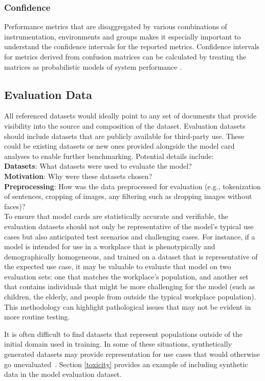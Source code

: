 \subsubsection{Confidence}
Performance metrics that are disaggregated by various combinations of instrumentation, environments and groups makes it especially important to understand the confidence intervals for the reported metrics. Confidence intervals for metrics derived from confusion matrices can be calculated by treating the matrices as probabilistic models of system performance \cite{goutte2005probabilistic}.


\subsection{Evaluation Data}
All referenced datasets would ideally point to any set of documents that provide visibility into the source and composition of the dataset. Evaluation datasets should include datasets that are publicly available for third-party use. These could be existing datasets or new ones provided alongside the model card analyses to enable further benchmarking.  Potential details include: \\
{\bf Datasets}:  What datasets were used to evaluate the model?   \\
{\bf Motivation}:  Why were these datasets chosen?\\
{\bf Preprocessing}:  How was the data preprocessed for evaluation (e.g., tokenization of sentences, cropping of images, any filtering such as dropping images without faces)?  \\

To ensure that model cards are statistically accurate and verifiable, the evaluation datasets should not only be representative of the model's typical use cases but also anticipated test scenarios and challenging cases.  For instance, if a model is intended for use in a workplace that is phenotypically and demographically homogeneous, and trained on a dataset that is representative of the expected use case, it may be valuable to evaluate that model on two evaluation sets: one that matches the workplace's population, and another set that contains individuals that might be more challenging for the model (such as children, the elderly, and people from outside the typical workplace population). This methodology can highlight pathological issues that may not be evident in more routine testing. 

It is often difficult to find datasets that represent populations outside of the initial domain used in training. In some of these situations, synthetically generated datasets 
may provide representation for use cases that would otherwise go unevaluated~\cite{synthetic}. Section \ref{toxicity} provides an example of including synthetic data in the model evaluation dataset.

